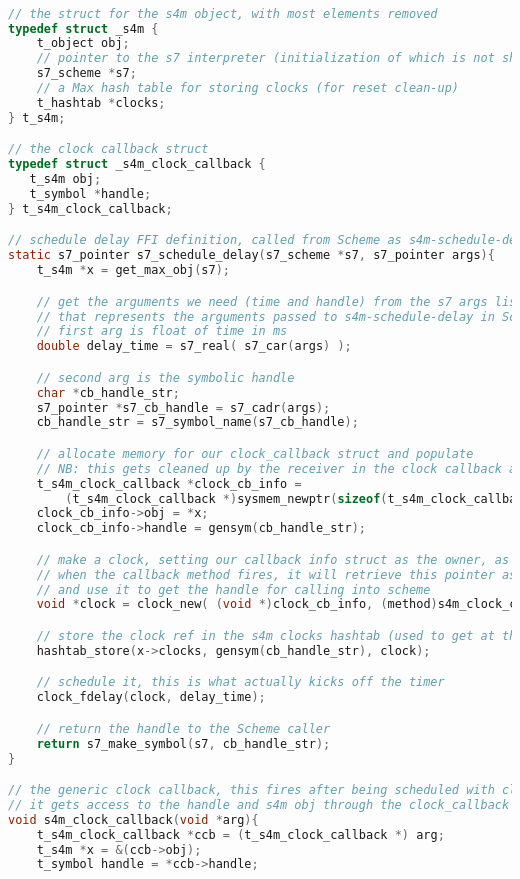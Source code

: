 \documentclass[acmsmall]{acmart}
\begin{document}
\begin{lstlisting}[language=C]

// the struct for the s4m object, with most elements removed
typedef struct _s4m {
    t_object obj;
    // pointer to the s7 interpreter (initialization of which is not shown)
    s7_scheme *s7;
    // a Max hash table for storing clocks (for reset clean-up)
    t_hashtab *clocks;     
} t_s4m;

// the clock callback struct
typedef struct _s4m_clock_callback {
   t_s4m obj;
   t_symbol *handle; 
} t_s4m_clock_callback;

// schedule delay FFI definition, called from Scheme as s4m-schedule-delay
static s7_pointer s7_schedule_delay(s7_scheme *s7, s7_pointer args){
    t_s4m *x = get_max_obj(s7);

    // get the arguments we need (time and handle) from the s7 args list
    // that represents the arguments passed to s4m-schedule-delay in Scheme
    // first arg is float of time in ms 
    double delay_time = s7_real( s7_car(args) );

    // second arg is the symbolic handle
    char *cb_handle_str;
    s7_pointer *s7_cb_handle = s7_cadr(args);
    cb_handle_str = s7_symbol_name(s7_cb_handle);

    // allocate memory for our clock_callback struct and populate
    // NB: this gets cleaned up by the receiver in the clock callback above
    t_s4m_clock_callback *clock_cb_info = 
        (t_s4m_clock_callback *)sysmem_newptr(sizeof(t_s4m_clock_callback));
    clock_cb_info->obj = *x;
    clock_cb_info->handle = gensym(cb_handle_str);

    // make a clock, setting our callback info struct as the owner, as a void pointer
    // when the callback method fires, it will retrieve this pointer as an arg 
    // and use it to get the handle for calling into scheme  
    void *clock = clock_new( (void *)clock_cb_info, (method)s4m_clock_callback);

    // store the clock ref in the s4m clocks hashtab (used to get at them for reset cancelling) 
    hashtab_store(x->clocks, gensym(cb_handle_str), clock); 

    // schedule it, this is what actually kicks off the timer
    clock_fdelay(clock, delay_time);

    // return the handle to the Scheme caller
    return s7_make_symbol(s7, cb_handle_str);
}

// the generic clock callback, this fires after being scheduled with clock_fdelay 
// it gets access to the handle and s4m obj through the clock_callback struct 
void s4m_clock_callback(void *arg){
    t_s4m_clock_callback *ccb = (t_s4m_clock_callback *) arg;
    t_s4m *x = &(ccb->obj);
    t_symbol handle = *ccb->handle; 
  

\end{lstlisting}
\end{document}

